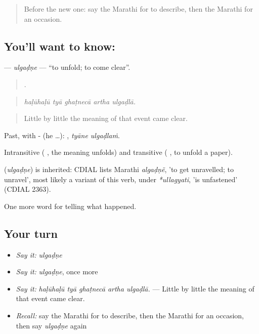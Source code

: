 \label{lesson:MR-C304-ulgadne}



\begin{quote}
Before the new one: say the Marathi for to describe, then the Marathi for an occasion.
\end{quote}

\subsection*{You'll want to know: }
\textbf{} — \emph{ulgaḍṇe} — \textquotedblleft{}to unfold; to come clear\textquotedblright{}.

\begin{quote}
    .
\end{quote}

\begin{quote}
\emph{haḷūhaḷū tyā ghaṭnecā artha ulgaḍlā.}
\end{quote}

\begin{quote}
Little by little the meaning of that event came clear.
\end{quote}

Past, with - (he …):  , \emph{tyāne ulgaḍlaṁ}.

Intransitive ( , the meaning unfolds) and transitive ( , to unfold a paper).

\begin{cousinweb}
\textbf{} (\emph{ulgaḍṇe}) is inherited: CDIAL lists Marathi \emph{algaḍṇẽ}, 'to get unravelled; to unravel', most likely a variant of this verb, under \emph{*ullagyati}, 'is unfastened' (CDIAL 2363).
\end{cousinweb}

\begin{grammarlens}[title={What you've built}]
One more word for telling what happened.
\end{grammarlens}

\subsection*{Your turn}
\begin{itemize}
\raggedright
  \item \emph{Say it:} \emph{ulgaḍṇe}
  \item \emph{Say it:} \emph{ulgaḍṇe}, once more
  \item \emph{Say it:} \emph{haḷūhaḷū tyā ghaṭnecā artha ulgaḍlā.} — Little by little the meaning of that event came clear.
  \item \emph{Recall:} say the Marathi for to describe, then the Marathi for an occasion, then say \emph{ulgaḍṇe} again
\end{itemize}

